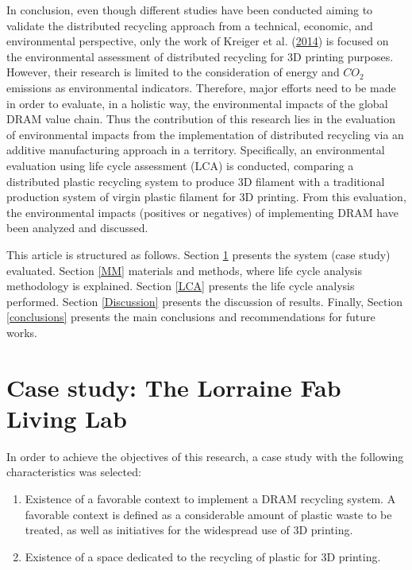 \documentclass[12pt]{elsarticle} %
\providecommand{\tightlist}{%
  \setlength{\itemsep}{0pt}\setlength{\parskip}{0pt}}
\begin{document}
In conclusion, even though different studies have been conducted aiming to validate the distributed recycling approach from a technical, economic, and environmental perspective, only the work of Kreiger et al. (\protect\hyperlink{ref-Kreiger2014}{2014}) is focused on the environmental assessment of distributed recycling for 3D printing purposes.
However, their research is limited to the consideration of energy and \(CO_{2}\) emissions as environmental indicators. Therefore, major efforts need to be made in order to evaluate, in a holistic way, the environmental impacts of the global DRAM value chain.
Thus the contribution of this research lies in the evaluation of environmental impacts from the implementation of distributed recycling via an additive manufacturing approach in a territory. Specifically, an environmental evaluation using life cycle assessment (LCA) is conducted, comparing a distributed plastic recycling system to produce 3D filament with a traditional production system of virgin plastic filament for 3D printing. From this evaluation, the environmental impacts (positives or negatives) of implementing DRAM have been analyzed and discussed.

This article is structured as follows. Section \ref{lf2l} presents the system (case study) evaluated.
Section \ref{MM} materials and methods, where life cycle analysis methodology is explained.
Section \ref{LCA} presents the life cycle analysis performed.
Section \ref{Discussion} presents the discussion of results.
Finally, Section \ref{conclusions} presents the main conclusions and recommendations for future works.

\hypertarget{lf2l}{%
\section{Case study: The Lorraine Fab Living Lab}\label{lf2l}}

In order to achieve the objectives of this research, a case study with the following characteristics was selected:

\begin{enumerate}
\def\labelenumi{\arabic{enumi}.}
\tightlist
\item
  Existence of a favorable context to implement a DRAM recycling system. A favorable context is defined as a considerable amount of plastic waste to be treated, as well as initiatives for the widespread use of 3D printing.
\item
  Existence of a space dedicated to the recycling of plastic for 3D printing.
\end{enumerate}
\end{document}
